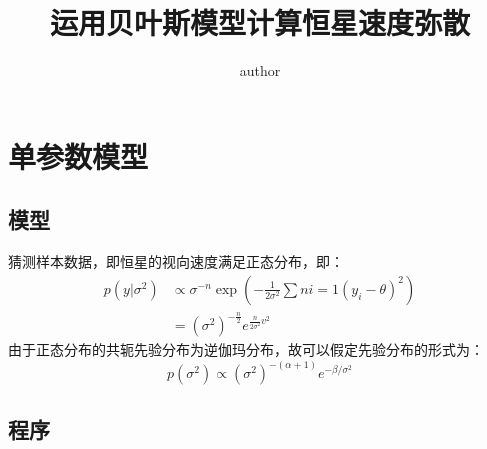 \documentclass[12pt, letterpaper]{article}
\title{运用贝叶斯模型计算恒星速度弥散}
\author{author}
\begin{document}
\maketitle

\newpage
\section{单参数模型}
\subsection{模型}
猜测样本数据，即恒星的视向速度满足正态分布，即：
$$\begin{aligned}
p(y|\sigma^2)&\propto \sigma^{-n}\exp(-\frac{1}{2\sigma^2}\sum{n}{i=1}(y_i-\theta)^2) \\
&=(\sigma^2)^{-\frac{n}{2}}e^{\frac{n}{2\sigma^2}v^2} 
\end{aligned}
$$
由于正态分布的共轭先验分布为逆伽玛分布，故可以假定先验分布的形式为：
$$p(\sigma^2)\propto(\sigma^2)^{-(\alpha+1)}e^{-\beta/\sigma^2}$$
\subsection{程序}
\end{document}
